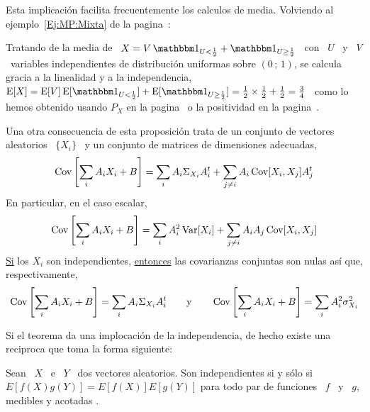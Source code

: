 {Esta implicaci\'on facilita frecuentemente  los calculos de media.  Volviendo al
ejemplo~\ref{Ej:MP:Mixta}  de la  pagina~\pageref{Ej:MP:Mixta}:
%
\begin{ejemplo}\label{Ej:EspMixtaInd}
  Tratando de la media de \ $X = V \, \un_{U < \frac12} + \un_{U \ge \frac12}$ \
  con \  $U$ \ y  \ $V$ \  variables independientes de  distribuci\'on uniformas
  sobre $(0 \, ; \, 1)$, se calcula gracia a la linealidad y a la independencia,
  \ $\Esp[X]  = \Esp[V]  \Esp[\un_{U < \frac12}]  + \Esp[\un_{U \ge  \frac12}] =
  \frac12 \times  \frac12 + \frac12 =  \frac34$ \ como lo  hemos obtenido usando
  $P_X$   en  la   pagina~\pageref{Ej:MP:EspMixta}  o   la  positividad   en  la
  pagina~\pageref{Ej:MP:EspMixtaPositiva}.
\end{ejemplo}

Una otra  consecuencia de  esta proposici\'on trata  de un conjunto  de vectores
aleatorios \ $\{ X_i \}$ \ y un conjunto de matrices de dimensiones adecuadas,
%
\[
\operatorname{Cov}\left[ \sum_i A_i X_i + B\right] =  \sum_i A_i \Sigma_{X_i} A_i^t + \sum_{j \ne
  i} A_i \operatorname{Cov}[X_i,X_j] A_j^t
\]
%
En particular, en el caso escalar,
%
\[
\operatorname{Cov}\left[ \sum_i A_i X_i + B \right]  = \sum_i A_i^2 \operatorname{Var}[X_i] + \sum_{j \ne i}
A_i A_j \operatorname{Cov}[X_i,X_j]
\]
%
\underline{Si}   los   $X_i$   son  independientes,   \underline{entonces}   las
covarianzas conjuntas son nulas as\'i que, respectivamente,
\[
\operatorname{Cov}\left[ \sum_i  A_i X_i +  B \right] =  \sum_i A_i \Sigma_{X_i}  A_i^t \qquad
\mbox{y}  \qquad  \operatorname{Cov}\left[  \sum_i  A_i   X_i  +  B  \right]  =  \sum_i  A_i^2
\sigma_{X_i}^2
\]

Si el  teorema da  una implocaci\'on  de la independencia,  de hecho  existe una
reciproca que toma la forma siguiente: }
%
\begin{teorema}
  Sean \ $X$ \ e \ $Y$ \ dos vectores aleatorios. Son independientes si y s\'olo
  si $E[f(X) g(Y)]=E[f(X)] E[g(Y)]$ para todo par  de funciones \ $f$ \ y \ $g$,
  medibles y acotadas \modif{de dimensiones adecuadas}.
\end{teorema}
%

